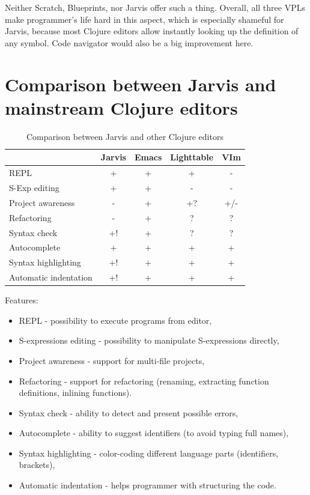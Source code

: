 \documentclass[11pt]{scrartcl}
\begin{document}
Neither Scratch, Blueprints, nor Jarvis offer such a thing.
Overall, all three VPLs make programmer’s life hard in this aspect, which is
especially shameful for Jarvis, because most Clojure editors allow instantly
looking up the definition of any symbol.
Code navigator would also be a big improvement here.

\section{Comparison between Jarvis and mainstream Clojure editors}
\begin{table}[hbt]
  \begin{tabular}{l|cccc}
    & Jarvis & Emacs & Lighttable & VIm \\
    \hline
    REPL & + & + & + & - \\
    S-Exp editing & + & + & - & - \\
    Project awareness & - & + & +? & +/- \\
    Refactoring & - & + & ? & ? \\
    Syntax check & +! & + & ? & ? \\
    Autocomplete & + & + & + & + \\
    Syntax highlighting & +! & + & + & + \\
    Automatic indentation & +! & + & + & + \\
  \end{tabular}
  \caption{Comparison between Jarvis and other Clojure editors}
\end{table}
Features:
\begin{itemize}
  \item REPL - possibility to execute programs from editor,
  \item S-expressions editing - possibility to manipulate S-expressions
    directly,
    
  \item Project awareness - support for multi-file projects,
    
  \item Refactoring - support for refactoring (renaming, extracting function
    definitions, inlining functions).
    
  \item Syntax check - ability to detect and present possible errors,
    
  \item Autocomplete - ability to suggest identifiers (to avoid typing full
    names),
    
  \item Syntax highlighting - color-coding different language parts
    (identifiers, brackets),
    
  \item Automatic indentation - helps programmer with structuring the code.
\end{itemize}
\end{document}

